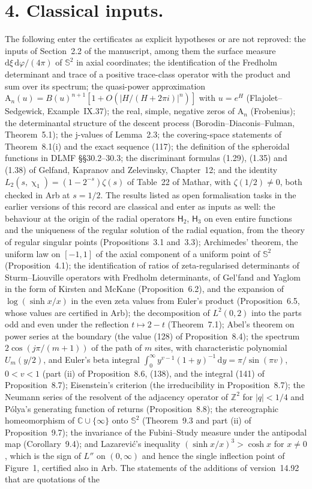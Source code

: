 \documentclass[11pt,a4paper]{article}
\newcommand{\eq}[1]{(#1)}
\begin{document}
\section*{4. Classical inputs.}
The following enter the certificates as explicit hypotheses or are not reproved: the inputs of Section~2.2 of the manuscript, among them the surface measure $\mathrm d\xi\,\mathrm d\varphi/(4\pi)$ of $\mathbb S^2$ in axial coordinates; the identification of the Fredholm determinant and trace of a positive trace-class operator with the product and sum over its spectrum; the quasi-power approximation $\mathrm A_n(u)=B(u)^{n+1}[1+O(|H/(H+2\pi i)|^n)]$ with $u=e^H$ (Flajolet--Sedgewick, Example~IX.37); the real, simple, negative zeros of $\mathrm A_n$ (Frobenius); the determinantal structure of the descent process (Borodin--Diaconis--Fulman, Theorem~5.1); the $\mathrm j$-values of Lemma~2.3; the covering-space statements of Theorem~8.1(i) and the exact sequence \eq{117}; the definition of the spheroidal functions in DLMF \S\S30.2--30.3; the discriminant formulas (1.29), (1.35) and (1.38) of Gelfand, Kapranov and Zelevinsky, Chapter~12; and the identity $L_2(s,\upchi_1)=(1-2^{-s})\zeta(s)$ of Table~22 of Mathar, with $\zeta(1/2)\neq0$, both checked in Arb at $s=1/2$. The results listed as open formalisation tasks in the earlier versions of this record are classical and enter as inputs as well: the behaviour at the origin of the radial operators $\mathsf H_2$, $\mathsf H_3$ on even entire functions and the uniqueness of the regular solution of the radial equation, from the theory of regular singular points (Propositions~3.1 and~3.3); Archimedes' theorem, the uniform law on $[-1,1]$ of the axial component of a uniform point of $\mathbb S^2$ (Proposition~4.1); the identification of ratios of zeta-regularised determinants of Sturm--Liouville operators with Fredholm determinants, of Gel'fand and Yaglom in the form of Kirsten and McKane (Proposition~6.2), and the expansion of $\log(\sinh x/x)$ in the even zeta values from Euler's product (Proposition~6.5, whose values are certified in Arb); the decomposition of $L^2(0,2)$ into the parts odd and even under the reflection $t\mapsto2-t$ (Theorem~7.1); Abel's theorem on power series at the boundary (the value \eq{128} of Proposition~8.4); the spectrum $2\cos(j\pi/(m+1))$ of the path of $m$ sites, with characteristic polynomial $U_m(y/2)$, and Euler's beta integral $\int_0^\infty y^{v-1}(1+y)^{-1}\,\mathrm dy=\pi/\sin(\pi v)$, $0<v<1$ (part (ii) of Proposition~8.6, \eq{138}, and the integral \eq{141} of Proposition~8.7); Eisenstein's criterion (the irreducibility in Proposition~8.7); the Neumann series of the resolvent of the adjacency operator of $\mathbb Z^2$ for $|q|<1/4$ and P\'olya's generating function of returns (Proposition~8.8); the stereographic homeomorphism of $\mathbb C\cup\{\infty\}$ onto $\mathbb S^2$ (Theorem~9.3 and part (ii) of Proposition~9.7); the invariance of the Fubini--Study measure under the antipodal map (Corollary~9.4); and Lazarevi\'c's inequality $(\sinh x/x)^3>\cosh x$ for $x\neq0$, which is the sign of $L''$ on $(0,\infty)$ and hence the single inflection point of Figure~1, certified also in Arb. The statements of the additions of version~14.92 that are quotations of the 
\end{document}
